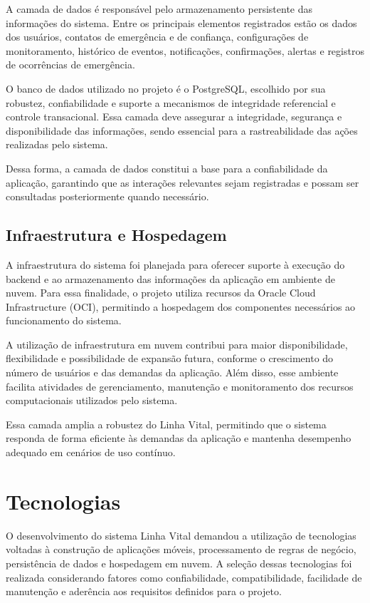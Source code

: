 A camada de dados é responsável pelo armazenamento persistente das informações do sistema. Entre os principais elementos registrados estão os dados dos usuários, contatos de emergência e de confiança, configurações de monitoramento, histórico de eventos, notificações, confirmações, alertas e registros de ocorrências de emergência.

O banco de dados utilizado no projeto é o PostgreSQL, escolhido por sua robustez, confiabilidade e suporte a mecanismos de integridade referencial e controle transacional. Essa camada deve assegurar a integridade, segurança e disponibilidade das informações, sendo essencial para a rastreabilidade das ações realizadas pelo sistema.

Dessa forma, a camada de dados constitui a base para a confiabilidade da aplicação, garantindo que as interações relevantes sejam registradas e possam ser consultadas posteriormente quando necessário.

\subsection{Infraestrutura e Hospedagem}

A infraestrutura do sistema foi planejada para oferecer suporte à execução do backend e ao armazenamento das informações da aplicação em ambiente de nuvem. Para essa finalidade, o projeto utiliza recursos da Oracle Cloud Infrastructure (OCI), permitindo a hospedagem dos componentes necessários ao funcionamento do sistema.

A utilização de infraestrutura em nuvem contribui para maior disponibilidade, flexibilidade e possibilidade de expansão futura, conforme o crescimento do número de usuários e das demandas da aplicação. Além disso, esse ambiente facilita atividades de gerenciamento, manutenção e monitoramento dos recursos computacionais utilizados pelo sistema.

Essa camada amplia a robustez do Linha Vital, permitindo que o sistema responda de forma eficiente às demandas da aplicação e mantenha desempenho adequado em cenários de uso contínuo.



\section{Tecnologias}

O desenvolvimento do sistema Linha Vital demandou a utilização de tecnologias voltadas à construção de aplicações móveis, processamento de regras de negócio, persistência de dados e hospedagem em nuvem. A seleção dessas tecnologias foi realizada considerando fatores como confiabilidade, compatibilidade, facilidade de manutenção e aderência aos requisitos definidos para o projeto.

